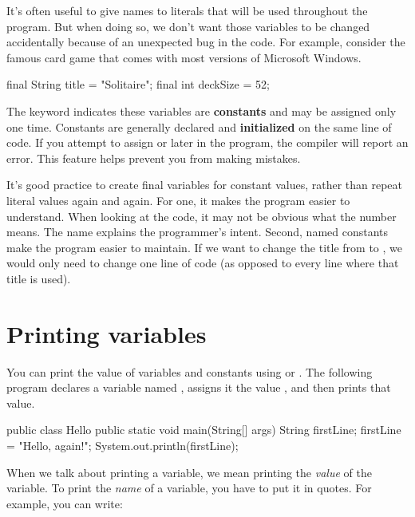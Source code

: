 It's often useful to give names to literals that will be used throughout the program.
But when doing so, we don't want those variables to be changed accidentally because of an unexpected bug in the code.
For example, consider the famous card game that comes with most versions of Microsoft Windows.

\begin{code}
    final String title = "Solitaire";
    final int deckSize = 52;
\end{code}


The keyword  indicates these variables are {\bf constants} and may be assigned only one time.
Constants are generally declared and {\bf initialized} on the same line of code.
If you attempt to assign  or  later in the program, the compiler will report an error.
This feature helps prevent you from making mistakes.

It's good practice to create final variables for constant values, rather than repeat literal values again and again.
For one, it makes the program easier to understand.
When looking at the code, it may not be obvious what the number  means.
The name  explains the programmer's intent.
Second, named constants make the program easier to maintain.
If we want to change the title from  to , we would only need to change one line of code (as opposed to every line where that title is used).


\section{Printing variables}
\label{printing}

You can print the value of variables and constants using  or .
The following program declares a variable named , assigns it the value , and then prints that value.

\begin{code}
public class Hello {
    public static void main(String[] args) {
        String firstLine;
        firstLine = "Hello, again!";
        System.out.println(firstLine);
    }
}
\end{code}

When we talk about printing a variable, we mean printing the {\em value} of the variable.
To print the {\em name} of a variable, you have to put it in quotes.
For example, you can write:

